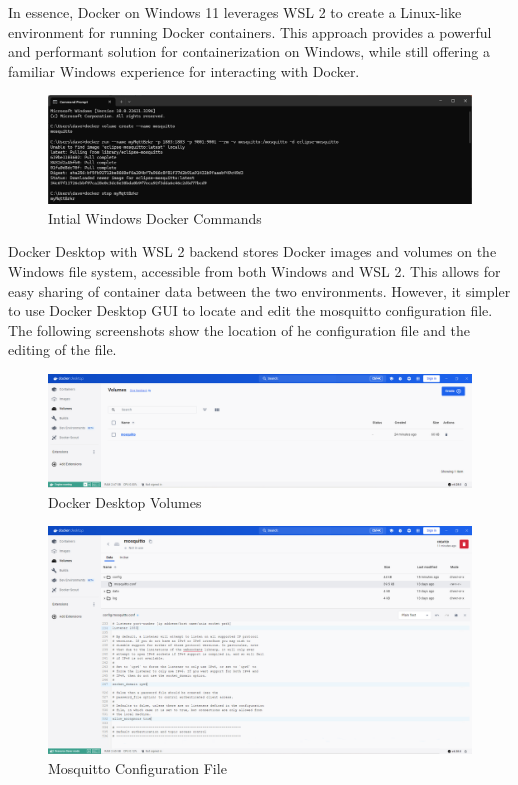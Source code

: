 In essence, Docker on Windows 11 leverages \ac{WSL 2} to create a Linux-like environment for running Docker containers. This approach provides a powerful and performant solution for containerization on Windows, while still offering a familiar Windows experience for interacting with Docker.
\begin{figure}[H]
    \centering
    \includegraphics[scale=0.4]{win1.png}
    \caption{Intial Windows Docker Commands}
    \label{fig:init-docker-cmds}
\end{figure}
Docker Desktop with \ac{WSL 2} backend stores Docker images and volumes on the Windows file system, accessible from both Windows and \ac{WSL 2}. This allows for easy sharing of container data between the two environments. However, it simpler to use Docker Desktop \ac{GUI} to locate and edit the mosquitto configuration file. The following screenshots show the location of he configuration file and the editing of the file.
\begin{figure}[H]
    \centering
    \includegraphics[scale=0.33]{volumes.png}
    \caption{Docker Desktop Volumes}
    \label{fig:mosquitto-volume}
\end{figure}
\begin{figure}[H]
    \centering
    \includegraphics[scale=0.33]{edit-config.png}
    \caption{Mosquitto Configuration File}
    \label{fig:mosquitto-config}
\end{figure}
